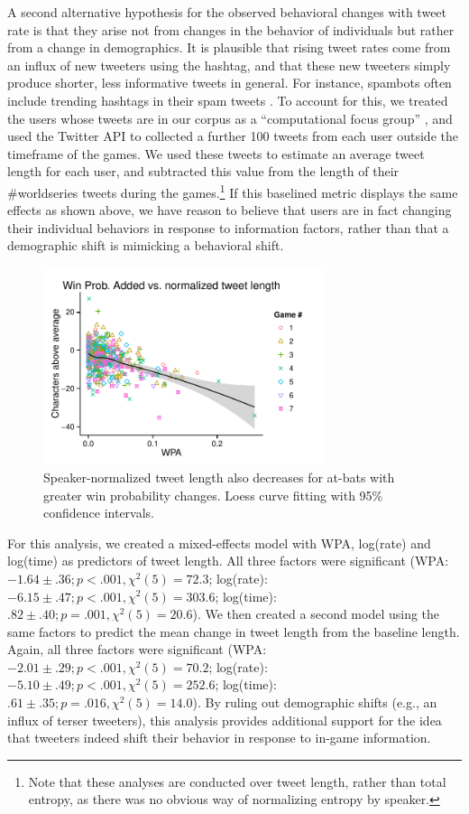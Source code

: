 \documentclass[11pt,letterpaper]{article}
\begin{document}
A second alternative hypothesis for the observed behavioral changes with tweet rate is that they arise not from changes in the behavior of individuals but rather from a change in demographics.  It is plausible that rising tweet rates come from an influx of new tweeters using the hashtag, and that these new tweeters simply produce shorter, less informative tweets in general.  For instance, spambots often include trending hashtags in their spam tweets \cite{martinez2013}. To account for this, we treated the users whose tweets are in our corpus as a ``computational focus group'' \cite{lin2013,lin2014}, and used the Twitter API to collected a further 100 tweets from each user outside the timeframe of the games.  We used these tweets to estimate an average tweet length for each user, and subtracted this value from the length of their \#worldseries tweets during the games.\footnote{Note that these analyses are conducted over tweet length, rather than total entropy, as there was no obvious way of normalizing entropy by speaker.} If this baselined metric displays the same effects as shown above, we have reason to believe that users are in fact changing their individual behaviors in response to information factors, rather than that a demographic shift is mimicking a behavioral shift.

\begin{figure}
 \centering
  \includegraphics[width=3.25in]{figures/fig4.pdf}\vspace*{-.7em}
 \caption{Speaker-normalized tweet length also decreases for at-bats with greater win probability changes. Loess curve fitting with 95\% confidence intervals.}\label{fig:wpa-ld-agg}\vspace*{-.5em}
\end{figure}

For this analysis, we created a mixed-effects model with WPA, log(rate) and log(time) as predictors of tweet length.  All three factors were significant (WPA: $-1.64 \pm .36; p<.001, \chi^2(5)=72.3$; log(rate): $-6.15 \pm .47; p<.001, \chi^2(5) =303.6 $; log(time): $.82 \pm .40; p=.001, \chi^2(5)=20.6$).  We then created a second model using the same factors to predict the mean change in tweet length from the baseline length. Again, all three factors were significant (WPA: $-2.01 \pm .29; p<.001, \chi^2(5)=70.2$; log(rate): $-5.10 \pm .49; p<.001, \chi^2(5) = 252.6$; log(time): $.61 \pm .35; p=.016, \chi^2(5)=14.0$).  By ruling out demographic shifts (e.g., an influx of terser tweeters), this analysis provides additional support for the idea that tweeters indeed shift their behavior in response to in-game information.
\end{document}
